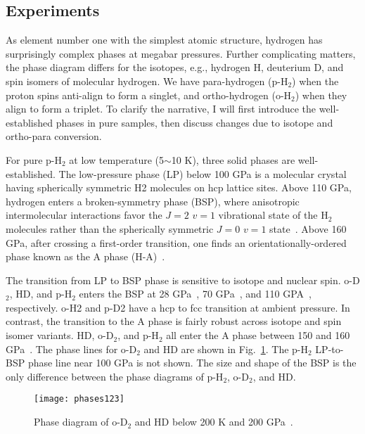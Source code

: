 \subsection{Experiments}
\label{sec:hsolid-expt}

As element number one with the simplest atomic structure, hydrogen has surprisingly complex phases at megabar pressures.
Further complicating matters, the phase diagram differs for the isotopes, e.g., hydrogen H, deuterium D, and spin isomers of molecular hydrogen.
We have para-hydrogen (p-H$_2$) when the proton spins anti-align to form a singlet, and ortho-hydrogen (o-H$_2$) when they align to form a triplet.
To clarify the narrative, I will first introduce the well-established phases in pure samples, then discuss changes due to isotope and ortho-para conversion.

For pure p-H$_2$ at low temperature (5$\sim$10 K), three solid phases are well-established. The low-pressure phase (LP) below 100 GPa is a molecular crystal having spherically symmetric H2 molecules on hcp lattice sites. Above 110 GPa, hydrogen enters a broken-symmetry phase (BSP), where anisotropic intermolecular interactions favor the $J=2$ $v=1$ vibrational state of the H$_2$ molecules rather than the spherically symmetric $J=0$ $v=1$ state~\cite{Lorenzana1990}. Above 160 GPa, after crossing a first-order transition, one finds an orientationally-ordered phase known as the A phase (H-A)~\cite{Lorenzana1989}.

The transition from LP to BSP phase is sensitive to isotope and nuclear spin. o-D$_2$, HD, and p-H$_2$ enters the BSP at 28 GPa~\cite{Silvera1981}, 70 GPa~\cite{Chijioke2006}, and 110 GPA~\cite{Lorenzana1990}, respectively. o-H2 and p-D2 have a hcp to fcc transition at ambient pressure. In contrast, the transition to the A phase is fairly robust across isotope and spin isomer variants. HD, o-D$_2$, and p-H$_2$ all enter the A phase between 150 and 160 GPa~\cite{Hemley1988,Lorenzana1989,Cui1994,Chijioke2006}. The phase lines for o-D$_2$ and HD are shown in Fig.~\ref{fig:hsolid-phases123}. The p-H$_2$ LP-to-BSP phase line near 100 GPa is not shown. The size and shape of the BSP is the only difference between the phase diagrams of p-H$_2$, o-D$_2$, and HD.

\begin{figure}[h]
\centering
\texttt{[image: phases123]}
\caption{Phase diagram of o-D$_2$ and HD below 200 K and 200 GPa~\cite{Chijioke2006}.}
\label{fig:hsolid-phases123}
\end{figure}

